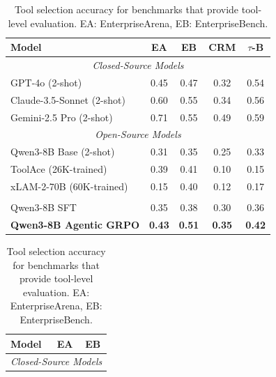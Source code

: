 \documentclass{article}
\theoremstyle{plain}
\theoremstyle{definition}
\theoremstyle{remark}
\begin{document}
\begin{table}[t]
\centering
\begin{minipage}[t]{0.58\textwidth}
\centering
\caption{Execution accuracy across benchmarks. EA: EnterpriseArena (Ours), EB: EnterpriseBench~\cite{vishwakarma2025can}, CRM: CRMArena~\cite{huang2025crmarena}, $\tau$-B: $\tau$-Bench~\cite{yao2025tau}. }
\label{tab:exec_results}
\small
\begin{tabular}{l|cccc}
\toprule
\textbf{Model} & \textbf{EA} & \textbf{EB} & \textbf{CRM} & \boldmath$\tau$\textbf{-B} \\
\midrule
\multicolumn{5}{c}{\textit{Closed-Source Models}} \\
\midrule
\rowcolor{GrayRow}
GPT-4o (2-shot) & 0.45 & 0.47 & 0.32 & 0.54 \\
\rowcolor{GrayRow}
Claude-3.5-Sonnet (2-shot) & 0.60 & 0.55 & 0.34 & 0.56 \\
\rowcolor{GrayRow}
Gemini-2.5 Pro (2-shot) & 0.71 & 0.55 & 0.49 & 0.59 \\
\midrule
\multicolumn{5}{c}{\textit{Open-Source Models}} \\
\midrule
\rowcolor{OpenSourceRow}
Qwen3-8B Base (2-shot) & 0.31 & 0.35 & 0.25 & 0.33 \\
\rowcolor{OpenSourceRow}
ToolAce (26K-trained) & 0.39 & 0.41 & 0.10 & 0.15 \\
\rowcolor{OpenSourceRow}
xLAM-2-70B (60K-trained) & 0.15 & 0.40 & 0.12 & 0.17 \\[2pt]
\rowcolor{OpenSourceRow}
\multicolumn{5}{c}{\underline{\textit{Our Platform-Trained Models ($<$1K)}}} \\[2pt]
\rowcolor{OpenSourceRow}
Qwen3-8B SFT & 0.35 & 0.38 & 0.30 & 0.36 \\
\rowcolor{OpenSourceRow}
\textbf{Qwen3-8B Agentic GRPO} & \textbf{0.43} & \textbf{0.51} & \textbf{0.35} & \textbf{0.42} \\
\bottomrule
\end{tabular}
\end{minipage}%
\hfill
\begin{minipage}[t]{0.38\textwidth}
\centering
\caption{Tool selection accuracy for benchmarks that provide tool-level evaluation. EA: EnterpriseArena, EB: EnterpriseBench.}
\label{tab:tool_results}
\small
\begin{tabular}{l|cc}
\toprule
\textbf{Model} & \textbf{EA} & \textbf{EB} \\
\midrule
\multicolumn{3}{c}{\textit{Closed-Source Models}} \\

\end{tabular}
\end{minipage}
\end{table}
\end{document}
